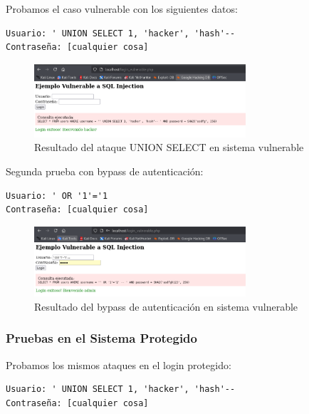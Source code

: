 \documentclass[12pt,a4paper]{article}
\begin{document}
Probamos el caso vulnerable con los siguientes datos:

\begin{lstlisting}[caption=Ataque SQL Injection - UNION SELECT]
Usuario: ' UNION SELECT 1, 'hacker', 'hash'-- 
Contraseña: [cualquier cosa]
\end{lstlisting}

\begin{figure}[H]
	\centering
	\includegraphics[width=0.7\textwidth]{./assets/img10.png}
	\caption{Resultado del ataque UNION SELECT en sistema vulnerable}
	\label{fig:ataque-union}
\end{figure}

Segunda prueba con bypass de autenticación:

\begin{lstlisting}[caption=Ataque SQL Injection - Bypass de autenticación]
Usuario: ' OR '1'='1
Contraseña: [cualquier cosa]
\end{lstlisting}

\begin{figure}[H]
	\centering
	\includegraphics[width=0.7\textwidth]{./assets/img11.png}
	\caption{Resultado del bypass de autenticación en sistema vulnerable}
	\label{fig:bypass-vulnerable}
\end{figure}

\subsubsection{Pruebas en el Sistema Protegido}

Probamos los mismos ataques en el login protegido:

\begin{lstlisting}[caption=Intento de ataque UNION SELECT en sistema protegido]
Usuario: ' UNION SELECT 1, 'hacker', 'hash'-- 
Contraseña: [cualquier cosa]
\end{lstlisting}
\end{document}
